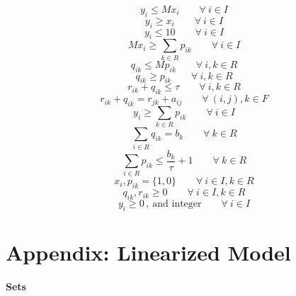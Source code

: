 \documentclass[12pt, fleqn]{article}
\begin{document}
\begin{equation}
    y_{i} \leq M x_{i} \qquad \forall\ i \in I
\end{equation}
\begin{equation}
    y_{i} \geq x_{i} \qquad \forall\ i \in I
\end{equation}
\begin{equation}
    y_{i} \leq 10 \qquad \forall\ i \in I
\end{equation}
\begin{equation}
    M x_{i} \geq \sum\limits_{k \in R}{p_{ik}} \qquad \forall\ i \in I
\end{equation}
\begin{equation}
    q_{ik} \leq M p_{ik} \qquad \forall\ i, k \in R
\end{equation}
\begin{equation}
    q_{ik} \geq p_{ik} \qquad \forall\ i, k \in R
\end{equation}
\begin{equation}
    r_{ik} + q_{ik} \leq \tau \qquad \forall\ i, k \in R
\end{equation}
\begin{equation}
    r_{ik} + q_{ik} = r_{jk} + a_{ij} \qquad \forall\ (i,j), k \in F
\end{equation}
\begin{equation}
    y_{i} \geq \sum\limits_{k \in R}{p_{ik}} \qquad \forall\ i \in I
\end{equation}
\begin{equation}
    \sum\limits_{i \in R}q_{ik} = b_{k} \qquad \forall\ k \in R
\end{equation}
\begin{equation}
    \sum\limits_{i \in R}p_{ik} \leq \frac{b_{k}}{\tau} + 1 \qquad \forall\ k \in R
\end{equation}
\begin{equation}
    x_{i}, p_{ik} = \{1,0\} \qquad \forall\ i \in I, k \in R
\end{equation}
\begin{equation}
    q_{ik}, r_{ik} \geq 0 \qquad \forall\ i \in I, k \in R
\end{equation}
\begin{equation}
    y_{i} \geq 0\,,\ \text{and integer} \qquad \forall\ i \in I
\end{equation}

\break
\section{Appendix: Linearized Model}
\medskip
\textbf{Sets}
\smallskip
\end{document}
